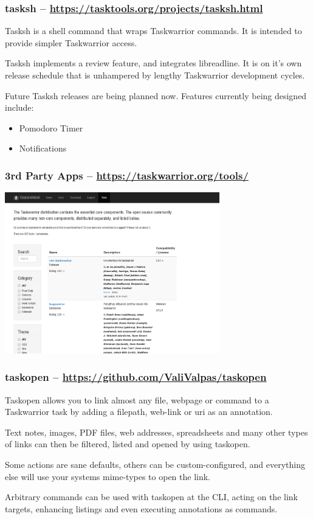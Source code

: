 \documentclass[t,handout,aspectratio=169]{beamer}
\begin{document}
\begin{frame}[fragile]\frametitle{tasksh -- \url{https://tasktools.org/projects/tasksh.html}}
    \vfill
    Tasksh is a shell command that wraps Taskwarrior commands. It is intended to provide simpler Taskwarrior access.

    Tasksh implements a review feature, and integrates libreadline. It is on it's own release schedule that is unhampered by lengthy Taskwarrior development cycles.

    Future Tasksh releases are being planned now. Features currently being designed include:
    \begin{itemize}
        \item Pomodoro Timer
        \item Notifications
    \end{itemize}
\end{frame}

\begin{frame}[fragile]\frametitle{3rd Party Apps -- \url{https://taskwarrior.org/tools/}}
    \begin{center}
        \href{https://taskwarrior.org/tools/}{\includegraphics[height=7cm]{3rdparty.png}}
    \end{center}
\end{frame}

\begin{frame}[fragile]\frametitle{taskopen -- \url{https://github.com/ValiValpas/taskopen}}
    \vfill
    Taskopen allows you to link almost any file, webpage or command to a Taskwarrior task by adding a filepath, web-link or uri as an annotation.

    Text notes, images, PDF files, web addresses, spreadsheets and many other types of links can then be filtered, listed and opened by using taskopen.

    Some actions are sane defaults, others can be custom-configured, and everything else will use your systems mime-types to open the link.

    Arbitrary commands can be used with taskopen at the CLI, acting on the link targets, enhancing listings and even executing annotations as commands.
\end{frame}
\end{document}
